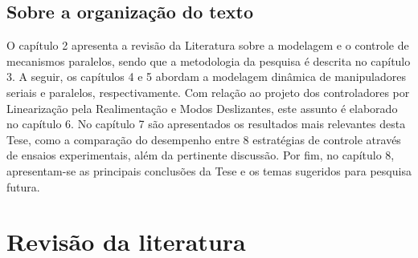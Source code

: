 \documentclass[]{politex}
\begin{document}




\section{Sobre a organização do texto}\label{organizacao}

O capítulo 2 apresenta a revisão da Literatura sobre a modelagem e o controle de mecanismos paralelos, sendo que a metodologia da pesquisa é descrita no capítulo 3. A seguir, os capítulos 4 e 5 abordam a modelagem dinâmica de manipuladores seriais e paralelos, respectivamente. Com relação ao projeto dos controladores por Linearização pela Realimentação e Modos Deslizantes, este assunto é elaborado no capítulo 6. No capítulo 7 são apresentados os resultados mais relevantes desta Tese, como a comparação do desempenho entre 8 estratégias de controle através de ensaios experimentais, além da pertinente discussão. Por fim, no capítulo 8, apresentam-se as principais conclusões da Tese e os temas sugeridos para pesquisa futura.

\chapter{Revisão da literatura}\label{revision}
\end{document}
